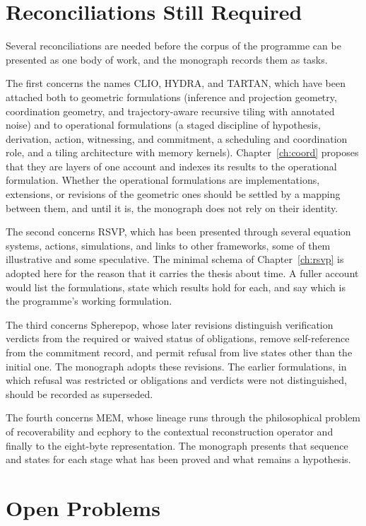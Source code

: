 \documentclass[11pt,twoside,openright]{book}
\theoremstyle{plain}
\theoremstyle{definition}
\theoremstyle{remark}
\newcommand{\memeight}{\mbox{MEM\textbar 8}}
\newcommand{\rsvp}{RSVP}
\begin{document}
\section{Reconciliations Still Required}

Several reconciliations are needed before the corpus of the programme can be presented as one body of work, and the monograph records them as tasks.

The first concerns the names CLIO, HYDRA, and TARTAN, which have been attached both to geometric formulations (inference and projection geometry, coordination geometry, and trajectory-aware recursive tiling with annotated noise) and to operational formulations (a staged discipline of hypothesis, derivation, action, witnessing, and commitment, a scheduling and coordination role, and a tiling architecture with memory kernels). Chapter~\ref{ch:coord} proposes that they are layers of one account and indexes its results to the operational formulation. Whether the operational formulations are implementations, extensions, or revisions of the geometric ones should be settled by a mapping between them, and until it is, the monograph does not rely on their identity.

The second concerns \rsvp{}, which has been presented through several equation systems, actions, simulations, and links to other frameworks, some of them illustrative and some speculative. The minimal schema of Chapter~\ref{ch:rsvp} is adopted here for the reason that it carries the thesis about time. A fuller account would list the formulations, state which results hold for each, and say which is the programme's working formulation.

The third concerns Spherepop, whose later revisions distinguish verification verdicts from the required or waived status of obligations, remove self-reference from the commitment record, and permit refusal from live states other than the initial one. The monograph adopts these revisions. The earlier formulations, in which refusal was restricted or obligations and verdicts were not distinguished, should be recorded as superseded.

The fourth concerns \memeight{}, whose lineage runs through the philosophical problem of recoverability and ecphory to the contextual reconstruction operator and finally to the eight-byte representation. The monograph presents that sequence and states for each stage what has been proved and what remains a hypothesis.

\section{Open Problems}
\end{document}
